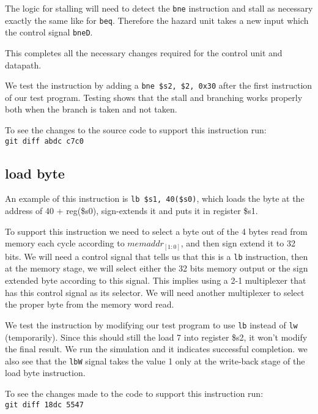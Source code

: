 \documentclass[titlepage,12pt,twoside,a4paper]{article}
\newcommand{\code}[1]{{\texttt{#1}}}
\begin{document}
The logic for stalling will need to detect the \code{bne} instruction and stall as necessary exactly the same like for \code{beq}. Therefore the hazard unit takes a new input which the control signal \code{bneD}.

This completes all the necessary changes required for the control unit and datapath.

We test the instruction by adding a \code{bne \$s2, \$2, 0x30} after the first instruction of our test program. Testing shows that the stall and branching works properly both when the branch is taken and not taken.

To see the changes to the source code to support this instruction run:\\
\code{git diff abdc c7c0}

\subsection{load byte}

An example of this instruction is \code{lb \$s1, 40(\$s0)}, which loads the byte at the address of 40 + reg(\$s0), sign-extends it and puts it in register \$s1.

To support this instruction we need to select a byte out of the 4 bytes read from memory each cycle according to $memaddr_{[1:0]}$, and then sign extend it to 32 bits. We will need a control signal that tells us that this is a \code{lb} instruction, then at the memory stage, we will select either the 32 bits memory output or the sign extended byte according to this signal. This implies using a 2-1 multiplexer that has this control signal as its selector. We will need another multiplexer to select the proper byte from the memory word read.

We test the instruction by modifying our test program to use \code{lb} instead of \code{lw} (temporarily). Since this should still the load 7 into register \$s2, it won't modify the final result. We run the simulation and it indicates successful completion. we also see that the \code{lbW} signal takes the value 1 only at the write-back stage of the load byte instruction.

To see the changes made to the code to support this instruction run:\\
\code{git diff 18dc 5547}

\end{document}
